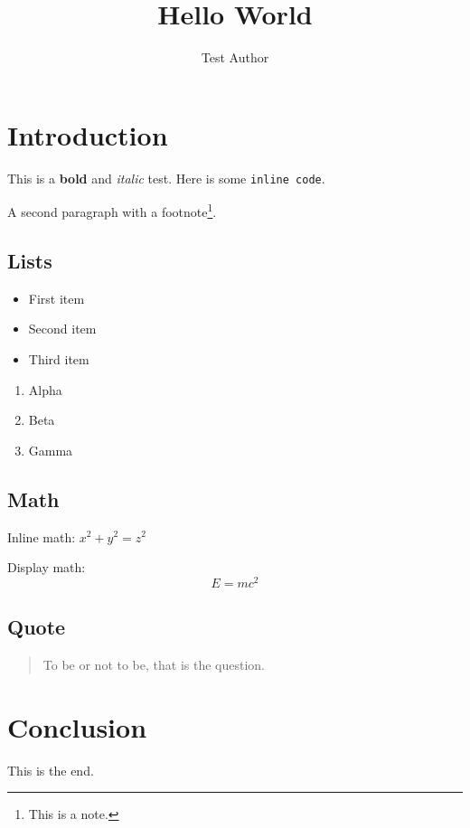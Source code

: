 \documentclass{article}
\title{Hello World}
\author{Test Author}
\begin{document}
\maketitle
\section{Introduction}
This is a \textbf{bold} and \textit{italic} test.
Here is some \texttt{inline code}.

A second paragraph with a footnote\footnote{This is a note.}.

\subsection{Lists}
\begin{itemize}
\item First item
\item Second item
\item Third item
\end{itemize}

\begin{enumerate}
\item Alpha
\item Beta
\item Gamma
\end{enumerate}

\subsection{Math}
Inline math: $x^2 + y^2 = z^2$

Display math:
\[ E = mc^2 \]

\subsection{Quote}
\begin{quote}
To be or not to be, that is the question.
\end{quote}

\section{Conclusion}
This is the end.
\end{document}
